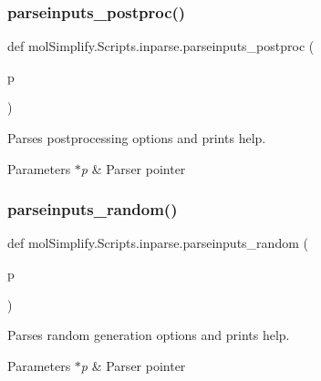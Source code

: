 \subsubsection{\texorpdfstring{parseinputs\+\_\+postproc()}{parseinputs\_postproc()}}
{\footnotesize\ttfamily def mol\+Simplify.\+Scripts.\+inparse.\+parseinputs\+\_\+postproc (\begin{DoxyParamCaption}\item[{}]{p }\end{DoxyParamCaption})}



Parses postprocessing options and prints help. 


\begin{DoxyParams}{Parameters}
{\em $\ast$p} & Parser pointer \\
\hline
\end{DoxyParams}
\mbox{\label{namespacemolSimplify_1_1Scripts_1_1inparse_ade2efa75bd64f4ac639b9dc48f461e72}} 
\subsubsection{\texorpdfstring{parseinputs\+\_\+random()}{parseinputs\_random()}}
{\footnotesize\ttfamily def mol\+Simplify.\+Scripts.\+inparse.\+parseinputs\+\_\+random (\begin{DoxyParamCaption}\item[{}]{p }\end{DoxyParamCaption})}



Parses random generation options and prints help. 


\begin{DoxyParams}{Parameters}
{\em $\ast$p} & Parser pointer \\
\hline
\end{DoxyParams}
\mbox{\label{namespacemolSimplify_1_1Scripts_1_1inparse_a763932f104eac1f7a337df62d810fc0c}} 
